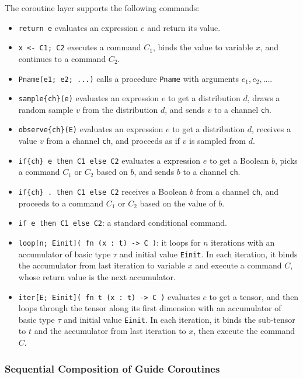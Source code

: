 The coroutine layer supports the following commands:
\begin{itemize}
  \item \texttt{return e} evaluates an expression $e$ and return its value.
  \item \texttt{x <- C1; C2} executes a command $C_1$, binds the value to
        variable $x$, and continues to a command $C_2$.
  \item \texttt{Pname(e1; e2; ...)} calls a procedure \texttt{Pname} with
        arguments $e_1, e_2, \ldots$.
  \item \verb$sample{ch}(e)$ evaluates an expression $e$ to get a distribution
        $d$, draws a random sample $v$ from the distribution $d$, and sends $v$
        to a channel \texttt{ch}.
  \item \verb$observe{ch}(E)$ evaluates an expression $e$ to get a
        distribution $d$, receives a value $v$ from a channel \texttt{ch}, and
        proceeds as if $v$ is sampled from $d$.
  \item \verb$if{ch} e then C1 else C2$ evaluates a expression $e$ to get a
        Boolean $b$, picks a command $C_1$ or $C_2$ based on $b$, and sends $b$
        to a channel \texttt{ch}.
  \item \verb$if{ch} . then C1 else C2$ receives a Boolean $b$ from a channel
        \texttt{ch}, and proceeds to a command $C_1$ or $C_2$ based on the value
        of $b$.
  \item \texttt{if e then C1 else C2}: a standard conditional command.
  \item \texttt{loop[n; Einit]( fn (x : t) -> C )}: it loops for $n$ iterations
        with an accumulator of basic type $\tau$ and initial value
        \texttt{Einit}.
        In each iteration, it binds the accumulator from last iteration to
        variable $x$ and execute a command $C$, whose return value is the next
        accumulator.
  \item \texttt{iter[E; Einit]( fn t (x : t) -> C )} evaluates $e$ to get a
        tensor, and then loops through the tensor along its first dimension with
        an accumulator of basic type $\tau$ and initial value \texttt{Einit}.
        In each iteration, it binds the sub-tensor to $t$ and the accumulator
        from last iteration to $x$, then execute the command $C$.
\end{itemize}

\subsubsection{Sequential Composition of Guide Coroutines}
